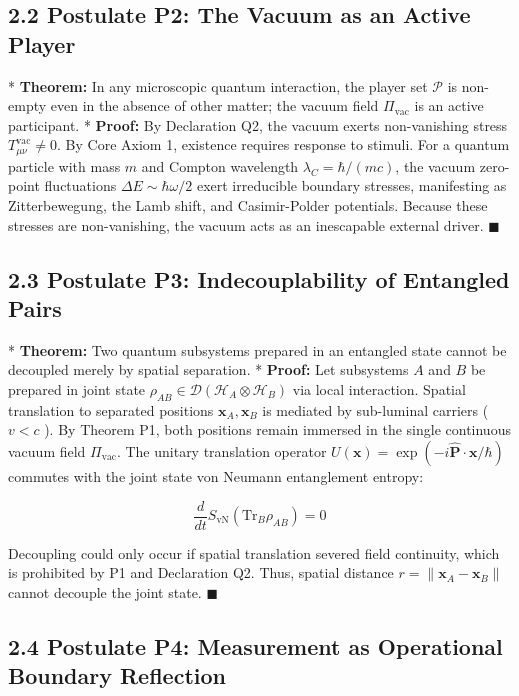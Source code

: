 \documentclass[11pt,a4paper]{article}
\theoremstyle{definition}\newtheorem{definition}{Definition}
\theoremstyle{remark}\newtheorem{remark}{Remark}
\begin{document}
\subsection{2.2 Postulate P2: The Vacuum as an Active Player}

* \textbf{Theorem:} In any microscopic quantum interaction, the player set $\mathcal{P}$ is non-empty even in the absence of other matter; the vacuum field $\Pi_{\text{vac}}$ is an active participant.
* \textbf{Proof:} By Declaration Q2, the vacuum exerts non-vanishing stress $T_{\mu\nu}^{\text{vac}} \neq 0$. By Core Axiom 1, existence requires response to stimuli. For a quantum particle with mass $m$ and Compton wavelength $\lambda_C = \hbar/(mc)$, the vacuum zero-point fluctuations $\Delta E \sim \hbar \omega / 2$ exert irreducible boundary stresses, manifesting as Zitterbewegung, the Lamb shift, and Casimir-Polder potentials. Because these stresses are non-vanishing, the vacuum acts as an inescapable external driver. $\blacksquare$
\subsection{2.3 Postulate P3: Indecouplability of Entangled Pairs}

* \textbf{Theorem:} Two quantum subsystems prepared in an entangled state cannot be decoupled merely by spatial separation.
* \textbf{Proof:} Let subsystems $A$ and $B$ be prepared in joint state $\rho_{AB} \in \mathcal{D}(\mathcal{H}_A \otimes \mathcal{H}_B)$ via local interaction. Spatial translation to separated positions $\mathbf{x}_A, \mathbf{x}_B$ is mediated by sub-luminal carriers ( $v < c$ ). By Theorem P1, both positions remain immersed in the single continuous vacuum field $\Pi_{\text{vac}}$. The unitary translation operator $U(\mathbf{x}) = \exp(-i \hat{\mathbf{P}} \cdot \mathbf{x} / \hbar)$ commutes with the joint state von Neumann entanglement entropy:


\begin{equation}
\frac{d}{dt} S_{\text{vN}}(\text{Tr}_B \rho_{AB}) = 0
\end{equation}


Decoupling could only occur if spatial translation severed field continuity, which is prohibited by P1 and Declaration Q2. Thus, spatial distance $r = \|\mathbf{x}_A - \mathbf{x}_B\|$ cannot decouple the joint state. $\blacksquare$
\subsection{2.4 Postulate P4: Measurement as Operational Boundary Reflection}
\end{document}
